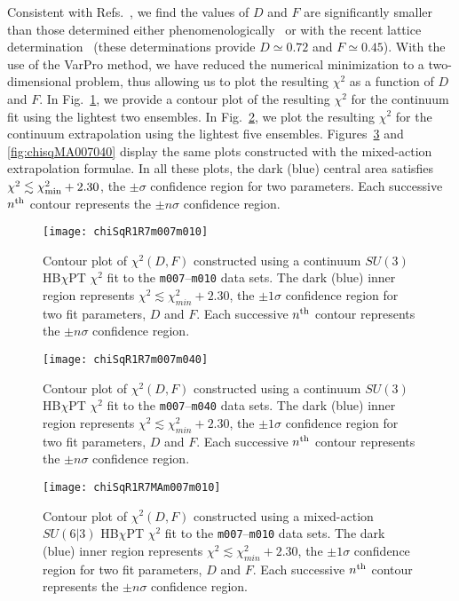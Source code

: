\documentclass[twocolumn,nofootinbib,prd,aps,superscriptaddress,tightenlines]{revtex4}
\begin{document}
Consistent with Refs.~\cite{WalkerLoud:2008bp,Ishikawa:2009vc}, we find the values of $D$ and $F$ are significantly smaller than those determined either phenomenologically~\cite{FloresMendieta:1998ii} or with the recent lattice determination~\cite{Lin:2007ap} (these determinations provide $D\simeq 0.72$ and $F\simeq 0.45$).  With the use of the VarPro method, we have reduced the numerical minimization to a two-dimensional problem, thus allowing us to plot the resulting $\chi^2$ as a function of $D$ and $F$.  In Fig.~\ref{fig:chisq007010}, we provide a contour plot of the resulting $\chi^2$ for the continuum fit using the lightest two ensembles.  In Fig.~\ref{fig:chisq007040}, we plot the resulting $\chi^2$ for the continuum extrapolation using the lightest five ensembles.  Figures~\ref{fig:chisqMA007010} and \ref{fig:chisqMA007040} display the same plots constructed with the mixed-action extrapolation formulae.  In all these plots, the dark (blue) central area satisfies $\chi^2 \lesssim \chi^2_{\rm min} +2.30$, the $\pm \sigma$ confidence region for two parameters.  Each successive $n^{\rm th}$ contour represents the $\pm n\sigma$ confidence region.
\begin{figure}[htb]
\texttt{[image: chiSqR1R7m007m010]}
\caption{Contour plot of $\chi^2(D,F)$ constructed using a continuum $SU(3)$ HB$\chi$PT $\chi^2$ fit to the \texttt{m007}--\texttt{m010} data sets.  The dark (blue) inner region represents $\chi^2 \lesssim \chi^2_{min} + 2.30$, the $\pm1\sigma$ confidence region for two fit parameters, $D$ and $F$.  Each successive $n^{\rm th}$ contour represents the $\pm n \sigma$ confidence region.
%
\label{fig:chisq007010}}
\end{figure}
\begin{figure}[htb]
\texttt{[image: chiSqR1R7m007m040]}
\caption{Contour plot of $\chi^2(D,F)$ constructed using a continuum $SU(3)$ HB$\chi$PT $\chi^2$ fit to the \texttt{m007}--\texttt{m040} data sets.  The dark (blue) inner region represents $\chi^2 \lesssim \chi^2_{min} + 2.30$, the $\pm1\sigma$ confidence region for two fit parameters, $D$ and $F$.  Each successive $n^{\rm th}$ contour represents the $\pm n \sigma$ confidence region. \label{fig:chisq007040}}
\end{figure}
\begin{figure}
\texttt{[image: chiSqR1R7MAm007m010]}
\caption{Contour plot of $\chi^2(D,F)$ constructed using a mixed-action $SU(6|3)$ HB$\chi$PT $\chi^2$ fit to the \texttt{m007}--\texttt{m010} data sets.  The dark (blue) inner region represents $\chi^2 \lesssim \chi^2_{min} + 2.30$, the $\pm1\sigma$ confidence region for two fit parameters, $D$ and $F$.  Each successive $n^{\rm th}$ contour represents the $\pm n \sigma$ confidence region. \label{fig:chisqMA007010}}
\end{figure}
\end{document}
